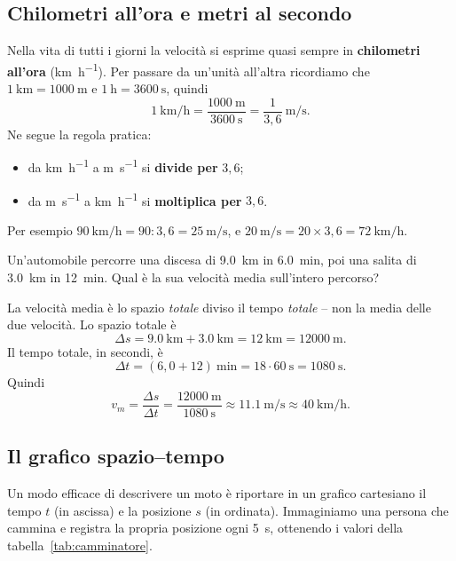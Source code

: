 \subsection{Chilometri all'ora e metri al secondo}
Nella vita di tutti i giorni la velocità si esprime quasi sempre in \textbf{chilometri all'ora} (\si{\kilo\metre\per\hour}). Per passare da un'unità all'altra ricordiamo che $\SI{1}{\kilo\metre} = \SI{1000}{\metre}$ e $\SI{1}{\hour} = \SI{3600}{\second}$, quindi
\[ \SI{1}{\kilo\metre\per\hour} = \frac{\SI{1000}{\metre}}{\SI{3600}{\second}} = \frac{1}{3{,}6}\ \si{\metre\per\second}. \]
Ne segue la regola pratica:
\begin{itemize}
    \item da \si{\kilo\metre\per\hour} a \si{\metre\per\second} si \textbf{divide per} $3{,}6$;
    \item da \si{\metre\per\second} a \si{\kilo\metre\per\hour} si \textbf{moltiplica per} $3{,}6$.
\end{itemize}
Per esempio $\SI{90}{\kilo\metre\per\hour} = 90 : 3{,}6 = \SI{25}{\metre\per\second}$, e $\SI{20}{\metre\per\second} = 20 \times 3{,}6 = \SI{72}{\kilo\metre\per\hour}$.

\begin{testexample}
Un'automobile percorre una discesa di \SI{9,0}{\kilo\metre} in \SI{6,0}{\minute}, poi una salita di \SI{3,0}{\kilo\metre} in \SI{12}{\minute}. Qual è la sua velocità media sull'intero percorso?

La velocità media è lo spazio \emph{totale} diviso il tempo \emph{totale} -- non la media delle due velocità. Lo spazio totale è
\[ \Delta s = \SI{9,0}{\kilo\metre} + \SI{3,0}{\kilo\metre} = \SI{12}{\kilo\metre} = \SI{12000}{\metre}. \]
Il tempo totale, in secondi, è
\[ \Delta t = (6{,}0 + 12)\ \si{\minute} = 18 \cdot \SI{60}{\second} = \SI{1080}{\second}. \]
Quindi
\[ v_m = \frac{\Delta s}{\Delta t} = \frac{\SI{12000}{\metre}}{\SI{1080}{\second}} \approx \SI{11,1}{\metre\per\second} \approx \SI{40}{\kilo\metre\per\hour}. \]
\end{testexample}

\subsection{Il grafico spazio--tempo}
Un modo efficace di descrivere un moto è riportare in un grafico cartesiano il tempo $t$ (in ascissa) e la posizione $s$ (in ordinata). Immaginiamo una persona che cammina e registra la propria posizione ogni \SI{5}{\second}, ottenendo i valori della tabella~\ref{tab:camminatore}.

